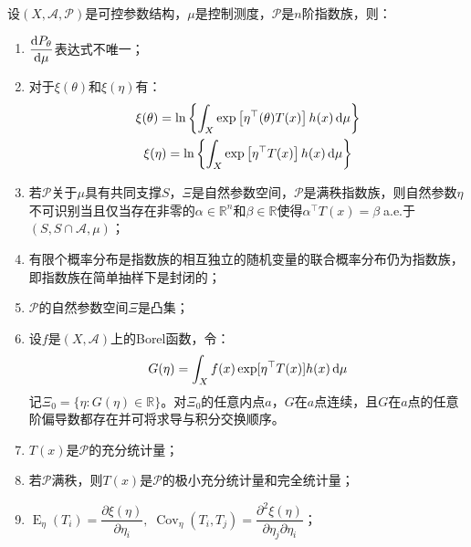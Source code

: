 \begin{property}\label{prop:ExponentialFamily}
	设$(X,\mathscr{A},\mathscr{P})$是可控参数结构，$\mu$是控制测度，$\mathscr{P}$是$n$阶指数族，则：
	\begin{enumerate}
		\item $\dfrac{\mathop{}\!\mathrm{d} P_{\theta}}{\mathop{}\!\mathrm{d}\mu}$表达式不唯一；
		\item 对于$\xi(\theta)$和$\xi(\eta)$有：
		\begin{gather*}
			\xi(\theta)=\ln\left\{\int_{X}\exp\left[\eta^{\top}(\theta)T(x)\right]h(x)\mathop{}\!\mathrm{d}\mu\right\} \\
			\xi(\eta)=\ln\left\{\int_{X}\exp\left[\eta^{\top}T(x)\right]h(x)\mathop{}\!\mathrm{d}\mu\right\}
		\end{gather*}
		\item 若$\mathscr{P}$关于$\mu$具有共同支撑$S$，$\Xi$是自然参数空间，$\mathscr{P}$是满秩指数族，则自然参数$\eta$不可识别当且仅当存在非零的$\alpha\in\mathbb{R}^{n}$和$\beta\in\mathbb{R}$使得$\alpha^{\top}T(x)=\beta\;$a.e.于$(S,S\cap\mathscr{A},\mu)$；
		\item 有限个概率分布是指数族的相互独立的随机变量的联合概率分布仍为指数族，即指数族在简单抽样下是封闭的；
		\item $\mathscr{P}$的自然参数空间$\Xi$是凸集；
		\item 设$f$是$(X,\mathscr{A})$上的Borel函数，令：
		\begin{equation*}
			G(\eta)=\int_{X}f(x)\exp[\eta^{\top}T(x)]h(x)\mathop{}\!\mathrm{d}\mu
		\end{equation*}
		记$\Xi_0=\{\eta:G(\eta)\in\mathbb{R}\}$。对$\Xi_0$的任意内点$a$，$G$在$a$点连续，且$G$在$a$点的任意阶偏导数都存在并可将求导与积分交换顺序。
		\item $T(x)$是$\mathscr{P}$的充分统计量；
		\item 若$\mathscr{P}$满秩，则$T(x)$是$\mathscr{P}$的极小充分统计量和完全统计量；
		\item $\operatorname{E}_{\eta}(T_i)=\dfrac{\partial\xi(\eta)}{\partial\eta_i},\;\operatorname{Cov}_{\eta}(T_i,T_j)=\dfrac{\partial^2\xi(\eta)}{\partial\eta_j\partial\eta_i}$；
	\end{enumerate}
\end{property}
